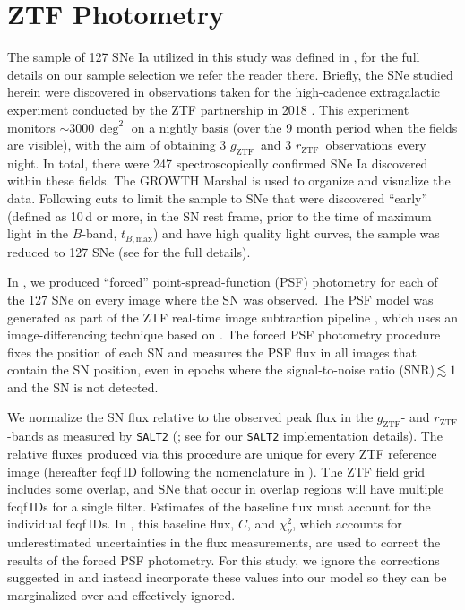\documentclass[twocolumn]{aastex63}
\newcommand{\rztf}{$r_\mathrm{ZTF}$}
\newcommand{\gztf}{$g_\mathrm{ZTF}$}
\newcommand{\tbmax}{$t_{B,\mathrm{max}}$}
\begin{document}
\section{ZTF Photometry}\label{sec:ztf}

The sample of 127 SNe Ia utilized in this study was defined in \citet{Yao19},
for the full details on our sample selection we refer the reader there.
Briefly, the SNe studied herein were discovered in observations taken for the
high-cadence extragalactic experiment conducted by the ZTF partnership in 2018
\citep{Bellm19a}. This experiment monitors $\sim$3000\,$\deg^2$ on a nightly
basis (over the 9 month period when the fields are visible), with the aim of
obtaining 3 \gztf\ and 3 \rztf\ observations every night. In total, there were
247 spectroscopically confirmed SNe Ia discovered within these fields. The
GROWTH Marshal \citep{Kasliwal19} is used to organize and visualize the data.
Following cuts to limit the sample to SNe that were discovered ``early''
(defined as 10\,d or more, in the SN rest frame, prior to the time of maximum
light in the $B$-band, \tbmax) and have high quality light curves, the sample
was reduced to 127 SNe (see \citealt{Yao19} for the full details).

In \citet{Yao19}, we produced ``forced'' point-spread-function (PSF)
photometry for each of the 127 SNe on every image where the SN was observed.
The PSF model was generated as part of the ZTF real-time image subtraction
pipeline \citep{Masci19}, which uses an image-differencing technique based on
\citet{Zackay16}. The forced PSF photometry procedure fixes the position of
each SN and measures the PSF flux in all images that contain the SN position,
even in epochs where the signal-to-noise ratio (SNR)\,$\lesssim 1$ and the SN is
not detected.

We normalize the SN flux relative to the observed peak flux in the \gztf- and
\rztf-bands as measured by \texttt{SALT2} (\citealt{Guy07}; see
\citealt{Yao19} for our \texttt{SALT2} implementation details). The relative
fluxes produced via this procedure are unique for every ZTF reference image
(hereafter fcqf\,ID following the nomenclature in \citealt{Yao19}). The ZTF
field grid includes some overlap, and SNe that occur in overlap regions will
have multiple fcqf\,IDs for a single filter. Estimates of the baseline flux
must account for the individual fcqf\,IDs. In \citet{Yao19}, this baseline
flux, $C$, and $\chi^2_{\nu}$, which accounts for underestimated uncertainties
in the flux measurements, are used to correct the results of the forced PSF
photometry. For this study, we ignore the corrections suggested in
\citet{Yao19} and instead incorporate these values into our model so they can
be marginalized over and effectively ignored.
\end{document}
